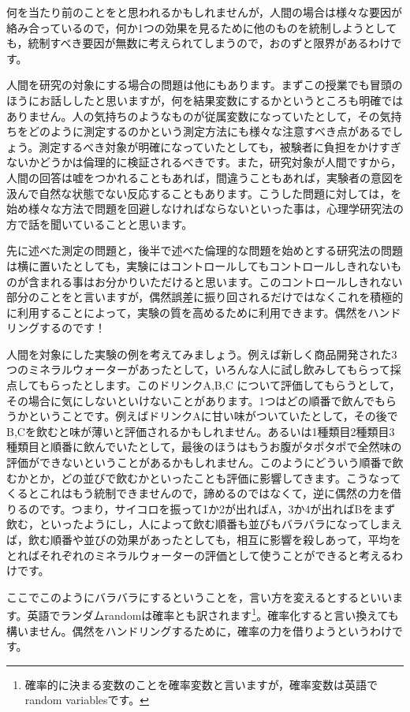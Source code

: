 \documentclass{ltjbook}
\begin{document}
何を当たり前のことをと思われるかもしれませんが，人間の場合は様々な要因が絡み合っているので，何か1つの効果を見るために他のものを統制しようとしても，統制すべき要因が無数に考えられてしまうので，おのずと限界があるわけです。

人間を研究の対象にする場合の問題は他にもあります。まずこの授業でも冒頭のほうにお話ししたと思いますが，何を結果変数にするかというところも明確ではありません。人の気持ちのようなものが従属変数になっていたとして，その気持ちをどのように測定するのかという測定方法にも様々な注意すべき点があるでしょう。測定するべき対象が明確になっていたとしても，被験者に負担をかけすぎないかどうかは倫理的に検証されるべきです。また，研究対象が人間ですから，人間の回答は嘘をつかれることもあれば，間違うこともあれば，実験者の意図を汲んで自然な状態でない反応することもあります。こうした問題に対しては，を始め様々な方法で問題を回避しなければならないといった事は，心理学研究法の方で話を聞いていることと思います。

先に述べた測定の問題と，後半で述べた倫理的な問題を始めとする研究法の問題は横に置いたとしても，実験にはコントロールしてもコントロールしきれないものが含まれる事はお分かりいただけると思います。このコントロールしきれない部分のことをと言いますが，偶然誤差に振り回されるだけではなくこれを積極的に利用することによって，実験の質を高めるために利用できます。偶然をハンドリングするのです！

人間を対象にした実験の例を考えてみましょう。例えば新しく商品開発された3つのミネラルウォーターがあったとして，いろんな人に試し飲みしてもらって採点してもらったとします。このドリンクA,B,C について評価してもらうとして，その場合に気にしないといけないことがあります。1つはどの順番で飲んでもらうかということです。例えばドリンクAに甘い味がついていたとして，その後でB,Cを飲むと味が薄いと評価されるかもしれません。あるいは1種類目2種類目3種類目と順番に飲んでいたとして，最後のほうはもうお腹がタポタポで全然味の評価ができないということがあるかもしれません。このようにどういう順番で飲むかとか，どの並びで飲むかといったことも評価に影響してきます。こうなってくるとこれはもう統制できませんので，諦めるのではなくて，逆に偶然の力を借りるのです。つまり，サイコロを振って1か2が出ればA，3か4が出ればBをまず飲む，といったようにし，人によって飲む順番も並びもバラバラになってしまえば，飲む順番や並びの効果があったとしても，相互に影響を殺しあって，平均をとればそれぞれのミネラルウォーターの評価として使うことができると考えるわけです。

ここでこのようにバラバラにするということを，言い方を変えるとするといいます。英語でランダムrandomは確率とも訳されます\footnote{確率的に決まる変数のことを確率変数と言いますが，確率変数は英語でrandom variablesです。}。確率化すると言い換えても構いません。偶然をハンドリングするために，確率の力を借りようというわけです。
\end{document}
